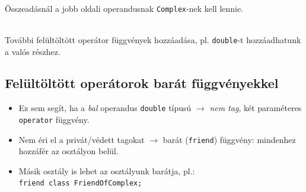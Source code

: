 \documentclass[usenames,dvipsnames,aspectratio=169]{beamer}
\begin{document}
\begin{frame}
    \begin{description}[mm]
        \item[Probléma:] \hfill \\ Összeadásnál a jobb oldali operandusnak \texttt{Complex}-nek kell lennie.
        \item[Megoldás:] \hfill \\ További felültöltött operátor függvények hozzáadása, pl. \texttt{double}-t hozzáadhatunk a valós részhez.
    \end{description}
    \begin{exampleblock}{}
        
    \end{exampleblock}
\end{frame}

\begin{frame}
    \begin{exampleblock}{}
        \small
        
    \end{exampleblock}
\end{frame}

\subsection{Felültöltött operátorok barát függvényekkel}

\begin{frame}
    \begin{itemize}
        \item Ez sem segít, ha a \emph{bal} operandus \texttt{double} típusú $\to$ \emph{nem tag}, két paraméteres \texttt{operator} függvény.
        \item Nem éri el a privát/védett tagokat $\to$ barát (\texttt{friend}) függvény: mindenhez hozzáfér az osztályon belül.
        \item Másik osztály is lehet az osztályunk barátja, pl.: \\ \texttt{friend class FriendOfComplex;}
    \end{itemize}
\end{frame}

\begin{frame}
    \begin{exampleblock}{}
        \scriptsize
        
        
    \end{exampleblock}
\end{frame}
\end{document}
